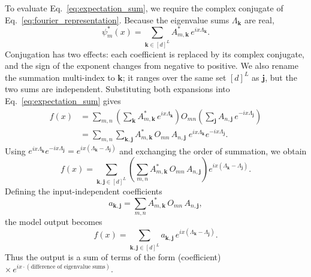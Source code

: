 \documentclass[12pt]{article}
\numberwithin{equation}{section}  %
\begin{document}
To evaluate Eq.~\eqref{eq:expectation_sum}, we require the complex conjugate of Eq.~\eqref{eq:fourier_representation}. Because the eigenvalue sums $\Lambda_{\mathbf{k}}$ are real,
\begin{equation}
\psi_m^*(x) = \sum_{\mathbf{k} \in [d]^L} A_{m,\mathbf{k}}^*\, e^{ix\Lambda_{\mathbf{k}}}.
\end{equation}
Conjugation has two effects: each coefficient is replaced by its complex conjugate, and the sign of the exponent changes from negative to positive. We also rename the summation multi-index to $\mathbf{k}$; it ranges over the same set $[d]^L$ as $\mathbf{j}$, but the two sums are independent. Substituting both expansions into Eq.~\eqref{eq:expectation_sum} gives
\begin{equation}
\begin{aligned}
f(x) &= \sum_{m,n} \left( \sum_{\mathbf{k}} A_{m,\mathbf{k}}^*\, e^{ix\Lambda_{\mathbf{k}}} \right) O_{mn} \left( \sum_{\mathbf{j}} A_{n,\mathbf{j}}\, e^{-ix\Lambda_{\mathbf{j}}} \right) \\
&= \sum_{m,n} \sum_{\mathbf{k},\mathbf{j}} A_{m,\mathbf{k}}^*\, O_{mn}\, A_{n,\mathbf{j}}\; e^{ix\Lambda_{\mathbf{k}}} e^{-ix\Lambda_{\mathbf{j}}}.
\end{aligned}
\end{equation}
Using $e^{ix\Lambda_{\mathbf{k}}} e^{-ix\Lambda_{\mathbf{j}}} = e^{ix(\Lambda_{\mathbf{k}}-\Lambda_{\mathbf{j}})}$ and exchanging the order of summation, we obtain
\begin{equation}
f(x) = \sum_{\mathbf{k},\mathbf{j} \in [d]^L} \left( \sum_{m,n} A_{m,\mathbf{k}}^*\, O_{mn}\, A_{n,\mathbf{j}} \right) e^{ix(\Lambda_{\mathbf{k}}-\Lambda_{\mathbf{j}})}.
\end{equation}
Defining the input-independent coefficients
\begin{equation}
a_{\mathbf{k},\mathbf{j}} = \sum_{m,n} A_{m,\mathbf{k}}^*\, O_{mn}\, A_{n,\mathbf{j}},
\label{eq:pair_coefficients}
\end{equation}
the model output becomes
\begin{equation}
f(x) = \sum_{\mathbf{k},\mathbf{j} \in [d]^L} a_{\mathbf{k},\mathbf{j}}\, e^{ix(\Lambda_{\mathbf{k}}-\Lambda_{\mathbf{j}})}.
\label{eq:f_pairs}
\end{equation}
Thus the output is a sum of terms of the form (coefficient) $\times\, e^{ix \cdot (\text{difference of eigenvalue sums})}$.
\end{document}
